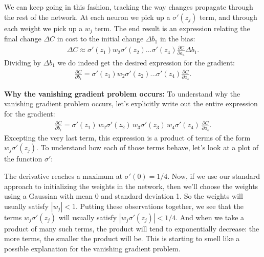 \documentclass[a4paper,twoside,10pt]{book}
\begin{document}
We can keep going in this fashion, tracking the way changes propagate through the rest of the network. At each neuron we pick up a $\sigma'(z_j)$ term, and through each weight we pick up a $w_j$ term. The end result is an expression relating the final change $\Delta C$ in cost to the initial change $\Delta b_1$ in the bias:
\begin{align}
\Delta C  \approx  \sigma'(z_1) w_2 \sigma'(z_2) \ldots \sigma'(z_4) \frac{\partial C}{\partial a_4} \Delta b_1. \tag{120}\label{eq:120}
\end{align}
Dividing by $\Delta b_1$ we do indeed get the desired expression for the gradient:
\begin{align}
\frac{\partial C}{\partial b_1} = \sigma'(z_1) w_2 \sigma'(z_2) \ldots \sigma'(z_4) \frac{\partial C}{\partial a_4}. \tag{121}\label{eq:121}
\end{align}

\textbf{Why the vanishing gradient problem occurs:} To understand why the vanishing gradient problem occurs, let's explicitly write out the entire expression for the gradient:
\begin{align}
\frac{\partial C}{\partial b_1} = \sigma'(z_1) \, w_2 \sigma'(z_2) \,w_3 \sigma'(z_3) \, w_4 \sigma'(z_4) \, \frac{\partial C}{\partial a_4}.\tag{122}\label{eq:122}
\end{align}
Excepting the very last term, this expression is a product of terms of the form $w_j\sigma'(z_j)$. To understand how each of those terms behave, let's look at a plot of the function $\sigma'$:
\begin{center} 
\end{center}%
The derivative reaches a maximum at $\sigma'(0)=1/4$. Now, if we use our standard approach to initializing the weights in the network, then we'll choose the weights using a Gaussian with mean 0 and standard deviation 1. So the weights will usually satisfy $|w_j|<1$. Putting these observations together, we see that the terms $w_j\sigma'(z_j)$ will usually satisfy $|w_j\sigma'(z_j)|<1/4$. And when we take a product of many such terms, the product will tend to exponentially decrease: the more terms, the smaller the product will be. This is starting to smell like a possible explanation for the vanishing gradient problem.
\end{document}
